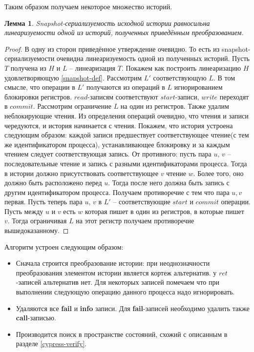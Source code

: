 \documentclass[pdftex,ptm,14pt,a4paper]{extreport}
\newtheorem{lemma}[theorem]{Лемма}
\theoremstyle{definition}
\begin{document}
Таким образом получаем некоторое множество историй.
\begin{lemma}
    Snapshot-сериализуемость исходной истории равносильна линеаризуемости одной из историй, полученных
    приведённым преобразованием.
\end{lemma}
\begin{proof}
    В одну из сторон приведённое утверждение очевидно. То есть из snapshot-сериализуемости очевидна линеаризуемость
    одной из полученных историй. Пусть $T$ получена из $H$ и $L$ -- линеаризация $T.$ Покажем как построить линеаризацию
    $H$ удовлетворяющую \ref{snapshot-def}. Рассмотрим $L'$ соответствующую $L.$ В том смысле, что операции в $L'$ получаются
    из операций в $L$ игнорированием блокировки регистров. $read$-записям соответствуют $start$-записи,
    $write$ переходят в $commit$. Рассмотрим ограничение $L$ на один из регистров. Также удалим неблокирующие чтения.
    Из определения операций очевидно, что чтения и записи чередуются, и история начинается с чтения.
    Покажем, что история устроена следующим образом: каждой записи предшествует соответствующее чтение(с тем же идентификатором
    процесса), устанавливающее блокировку и за каждым чтением следует соответствующая запись. От противного: пусть пара $u$, $v$
    -- последовательные чтение и запись с разными идентификаторами процесса. Тогда в истории должно присутствовать соответствующее
    $v$ чтение $w$. Более того, оно должно быть расположено перед $u.$ Тогда после него должна быть запись с другим идентификатором
    процесса. Получаем противоречие с тем что пара $u, v$ первая. Пусть теперь пара $u$, $v$ в $L'$ -- соответствующие $start$ и
    $commit$ операции. Пусть между $u$ и $v$ есть $w$ которая пишет в один из регистров, в которые пишет $v.$ Тогда ограничивая $L$ на
    этот регистр получаем противоречие вышедоказанному.
\end{proof}

Алгоритм устроен следующим образом:
\begin{itemize}
    \item Сначала строится преобразование истории: при неоднозначности преобразования элементом истории является кортеж альтернатив.
        у $ret$-записей альтернатив нет. Для некоторых записей помечаем что при выполнении следующую операцию
        данного процесса надо игнорировать.
    \item Удаляются все \textbf{fail} и \textbf{info} записи. Для \textbf{fail}-записей необходимо удалить также \textbf{call}-записью.
    \item Производится поиск в пространстве состояний, схожий с описанным в разделе \ref{cypress-verify}.
\end{itemize}
\end{document}
